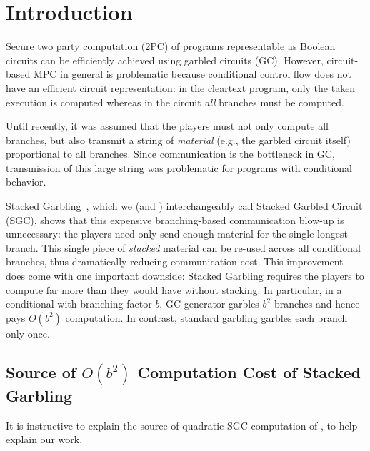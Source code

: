 \section{Introduction}\label{sec:intro}

Secure two party computation (2PC) of programs representable as Boolean circuits can be efficiently achieved using garbled circuits (GC).
%
However,  circuit-based MPC in general is problematic because conditional
control flow does not have an efficient circuit representation:
in the cleartext program, only the taken execution is computed whereas in
the circuit \emph{all} branches must be computed.

%
Until recently, it was assumed that the players must not only compute
all branches, but also transmit a string of \emph{material} (e.g., the garbled circuit itself) 
proportional to all branches.  
Since communication is the bottleneck in GC, transmission of this large string was
problematic for programs with conditional behavior.

Stacked Garbling~\HK, which we (and \HK)  interchangeably call Stacked Garbled Circuit (SGC), shows that
this expensive branching-based communication blow-up is unnecessary: the players need only
send enough material for the single longest branch. This single
piece of \emph{stacked} material can be re-used across all conditional branches, thus
dramatically reducing communication cost.
%
This improvement does come with one important downside:
Stacked Garbling requires the players to compute far more than they
would have without stacking.
In particular, in a conditional with branching factor $b$, \HK GC generator garbles $b^2$ branches and hence pays $O(b^2)$ computation.  In contrast, standard garbling garbles each branch only once.

\subsection{Source of $O(b^2)$ Computation Cost of \HK Stacked Garbling }
\label{sec:bsquaredcost}

It is instructive to explain the source of quadratic SGC computation of \HK, to help explain our work.

